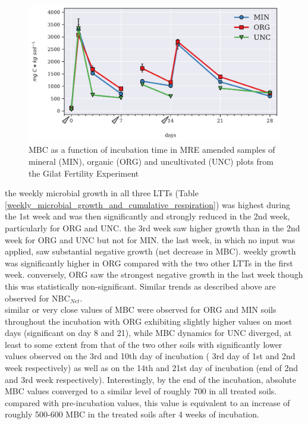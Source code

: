			\begin{figure}[H]
				\centering
				\includegraphics[scale=0.8,width=\linewidth]{thesis_figures/main_incubation/MRE_treated/MBC.pdf}
				\caption{MBC as a function of incubation time in MRE amended samples of mineral (MIN), organic (ORG) and uncultivated (UNC) plots from the Gilat Fertility Experiment}
				\label{fig:mbc_treated_main}
			\end{figure}
			\vspace{1cm}
			\noindent
			the weekly microbial growth in all three LTTs (Table \ref{weekly_microbial_growth_and_cumulative_respiration}) was highest during the 1st week and was then significantly and strongly reduced in the 2nd week,  particularly for ORG and UNC. the 3rd week saw higher growth than in the 2nd week for ORG and UNC but not for MIN. the last week, in which no input was applied, saw substantial negative growth (net decrease in MBC). weekly growth was significantly higher in ORG compared with the two other LTTs in the first week. conversely, ORG saw the strongest negative growth in the last week though this was statistically non-significant. Similar trends as described above are observed for NBC$ _{Net} $.\\
			
			similar or very close values of MBC were observed for ORG and MIN soils throughout the incubation with ORG exhibiting slightly higher values on most days (significant on day 8 and 21), while MBC dynamics for UNC diverged, at least to some extent from that of the two other soils with significantly lower values observed on the 3rd and 10th day of incubation ( 3rd day of 1st and 2nd week respectively) as well as on the 14th and 21st day of incubation (end of 2nd and 3rd week respectively). Interestingly, by the end of the incubation, absolute MBC values converged to a similar level of roughly 700 \genericunit in all treated soils. compared with pre-incubation values, this value is equivalent to an increase of  roughly 500-600 \genericunit MBC in the treated soils after 4 weeks of incubation.\\






